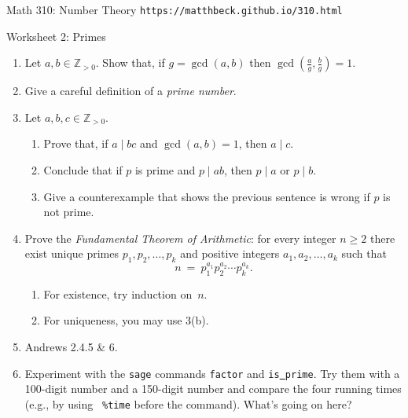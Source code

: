 \documentclass[11pt]{article}
\def\Z{\mathbb{Z}}
\def\sage{{\tt sage} }
\begin{document}
\setlength{\parindent}{0pt}
\setlength{\parskip}{0.2cm}

$\mbox{}$
\vspace{-1in}

{ Math 310: Number Theory} \hfill {\tt https://matthbeck.github.io/310.html}

\vspace{.1in}

\begin{center}
\Large{Worksheet 2: Primes}
\end{center}

\begin{enumerate}

\item Let $a, b \in \Z_{ >0 }$.
Show that, if $g = \gcd(a,b)$ then $\gcd(\frac a g, \frac b g) = 1$.

\item Give a careful definition of a \emph{prime number}.

\item Let $a, b, c \in \Z_{ >0 }$.
  \begin{enumerate}
  \item Prove that, if $a \mid bc$ and $\gcd(a,b) = 1$, then $a \mid c$.
  \item Conclude that if $p$ is prime and $p \mid ab$, then $p \mid a$ or $p \mid b$.
  \item Give a counterexample that shows the previous sentence is wrong if $p$ is not prime.
  \end{enumerate}

\item Prove the \emph{Fundamental Theorem of Arithmetic}: for every integer $n \ge 2$ there exist unique primes
$p_1, p_2, \dots, p_k$ and positive integers $a_1, a_2, \dots, a_k$ such that
\[
  n \ = \ p_1^{ a_1 } p_2^{ a_2 } \cdots p_k^{ a_k } .
\]
  \begin{enumerate}
  \item For existence, try induction on~$n$.
  \item For uniqueness, you may use 3(b).
  \end{enumerate}

\item Andrews 2.4.5 \& 6.

\item Experiment with the \sage commands {\tt factor} and {\tt is\underline{ }prime}.
Try them with a 100-digit number and a 150-digit number and compare the four running times (e.g., by using {\tt
\%time} before the command). What's going on here?


\end{enumerate}
\end{document}
